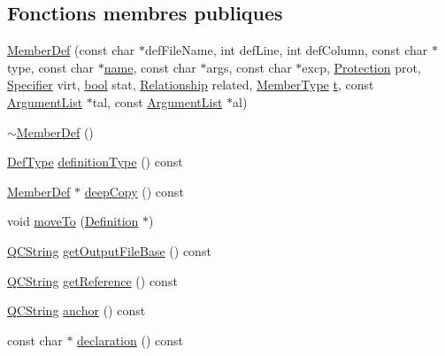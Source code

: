 \subsection*{Fonctions membres publiques}
\begin{DoxyCompactItemize}
\item 
\hyperlink{class_member_def_a3cda83ecd84802bf41b3d49f8252e62c}{Member\+Def} (const char $\ast$def\+File\+Name, int def\+Line, int def\+Column, const char $\ast$type, const char $\ast$\hyperlink{class_definition_a99481361779e85f0c1556709de7d9e5b}{name}, const char $\ast$args, const char $\ast$excp, \hyperlink{types_8h_a90e352184df58cd09455fe9996cd4ded}{Protection} prot, \hyperlink{types_8h_ab16236bdd10ddf4d73a9847350f0017e}{Specifier} virt, \hyperlink{qglobal_8h_a1062901a7428fdd9c7f180f5e01ea056}{bool} stat, \hyperlink{types_8h_a9d625fe894d9313ec78df1d78553f32e}{Relationship} related, \hyperlink{types_8h_a63e3de542c5d38de617ab78c8c8f5a41}{Member\+Type} \hyperlink{058__bracket__recursion_8tcl_a69e959f6901827e4d8271aeaa5fba0fc}{t}, const \hyperlink{class_argument_list}{Argument\+List} $\ast$tal, const \hyperlink{class_argument_list}{Argument\+List} $\ast$al)
\item 
\hyperlink{class_member_def_a2c5a0de011bf7fcfd2e97b66b6ea5a49}{$\sim$\+Member\+Def} ()
\item 
\hyperlink{class_definition_intf_ada60114bc621669dd8c19edfc6421766}{Def\+Type} \hyperlink{class_member_def_ac8dc2b4ba2c56590b83dfd368f6a9004}{definition\+Type} () const 
\item 
\hyperlink{class_member_def}{Member\+Def} $\ast$ \hyperlink{class_member_def_ad45e746ec18817b0a0565186be8ac42d}{deep\+Copy} () const 
\item 
void \hyperlink{class_member_def_a969464d35aace74201c61cdbd8c507bb}{move\+To} (\hyperlink{class_definition}{Definition} $\ast$)
\item 
\hyperlink{class_q_c_string}{Q\+C\+String} \hyperlink{class_member_def_a6190309702ba12f557c4b3ccc171483b}{get\+Output\+File\+Base} () const 
\item 
\hyperlink{class_q_c_string}{Q\+C\+String} \hyperlink{class_member_def_a33933dad190eb78050cc5467228be5f6}{get\+Reference} () const 
\item 
\hyperlink{class_q_c_string}{Q\+C\+String} \hyperlink{class_member_def_a09dd84c129c5b2cdd39fca8d9ef096a8}{anchor} () const 
\item 
const char $\ast$ \hyperlink{class_member_def_ad22a37cf3529aebe288ed7d2055ccc24}{declaration} () const 
\item 

\end{DoxyCompactItemize}
